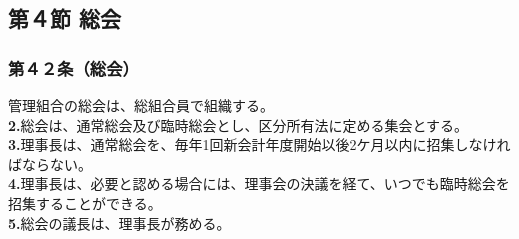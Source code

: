 \documentclass[12pt,uplatex]{jsarticle}
\begin{document}
\begin{center}
\subsection*{第４節 総会}
\end{center}
\subsubsection*{第４２条（総会）}
管理組合の総会は、総組合員で組織する。\\
\textbf{2.}総会は、通常総会及び臨時総会とし、区分所有法に定める集会とする。\\
\textbf{3.}理事長は、通常総会を、毎年1回新会計年度開始以後2ケ月以内に招集しなければならない。\\
\textbf{4.}理事長は、必要と認める場合には、理事会の決議を経て、いつでも臨時総会を招集することができる。\\
\textbf{5.}総会の議長は、理事長が務める。
\end{document}
